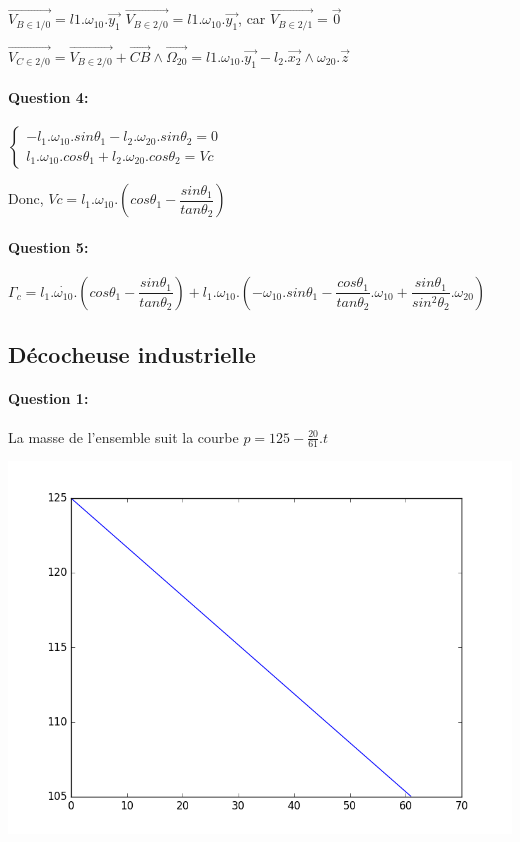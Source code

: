 $\overrightarrow{V_{B\in1/0}}=l1.\omega_{10}.\overrightarrow{y_1}$
$\overrightarrow{V_{B\in2/0}}=l1.\omega_{10}.\overrightarrow{y_1}$, car $\overrightarrow{V_{B\in2/1}}=\overrightarrow{0}$

$\overrightarrow{V_{C\in2/0}}=\overrightarrow{V_{B\in2/0}}+\overrightarrow{CB}\wedge\overrightarrow{\Omega_{20}}
=l1.\omega_{10}.\overrightarrow{y_1}-l_2.\overrightarrow{x_2}\wedge\omega_{20}.\overrightarrow{z}$

\paragraph{Question 4:}

$\left\{\begin{array}{l}
-l_1.\omega_{10}.sin\theta_1-l_2.\omega_{20}.sin\theta_2=0\\
l_1.\omega_{10}.cos\theta_1+l_2.\omega_{20}.cos\theta_2=Vc
\end{array}\right.$

Donc, $Vc=l_1.\omega_{10}.\left(cos\theta_1-\dfrac{sin\theta_1}{tan\theta_2}\right)$

\paragraph{Question 5:} 

$\Gamma_c=l_1.\dot{\omega_{10}}.\left(cos\theta_1-\dfrac{sin\theta_1}{tan\theta_2}\right)+l_1.\omega_{10}.\left(-\omega_{10}.sin\theta_1-\dfrac{cos\theta_1}{tan\theta_2}.\omega_{10}+\dfrac{sin\theta_1}{sin^2\theta_2}.\omega_{20}\right)$

\subsection{Décocheuse industrielle}

\paragraph{Question 1:}

La masse de l'ensemble suit la courbe $p=125-\frac{20}{61}.t$

\begin{center}
 \includegraphics[width=0.3\linewidth]{img/courbe_poids}
\end{center}

